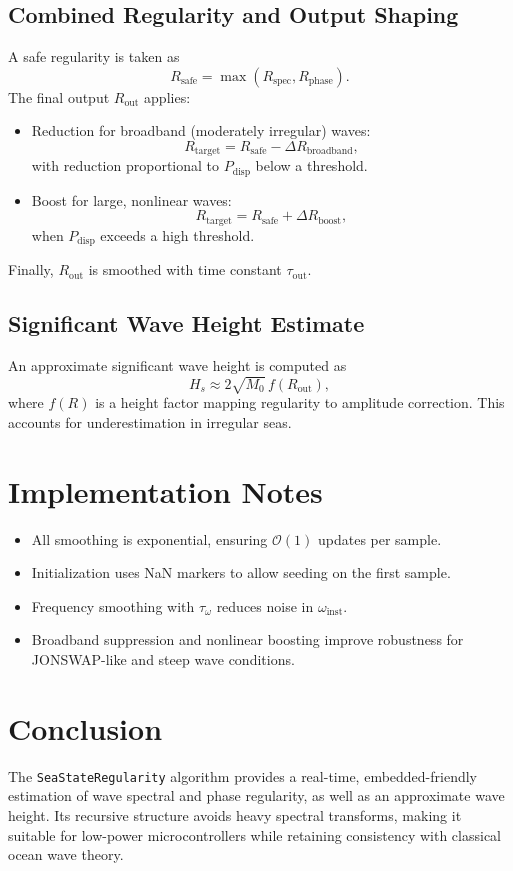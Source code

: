 \documentclass[11pt]{article}
\begin{document}
\subsection{Combined Regularity and Output Shaping}
A safe regularity is taken as
\[
R_{\text{safe}} = \max(R_{\text{spec}}, R_{\text{phase}}).
\]
The final output $R_{\text{out}}$ applies:
\begin{itemize}
    \item Reduction for broadband (moderately irregular) waves:
    \[
    R_{\text{target}} = R_{\text{safe}} - \Delta R_{\text{broadband}},
    \]
    with reduction proportional to $P_{\text{disp}}$ below a threshold.
    \item Boost for large, nonlinear waves:
    \[
    R_{\text{target}} = R_{\text{safe}} + \Delta R_{\text{boost}},
    \]
    when $P_{\text{disp}}$ exceeds a high threshold.
\end{itemize}
Finally, $R_{\text{out}}$ is smoothed with time constant $\tau_{\text{out}}$.

\subsection{Significant Wave Height Estimate}
An approximate significant wave height is computed as
\begin{equation}
H_s \approx 2\sqrt{M_0}\, f(R_{\text{out}}),
\end{equation}
where $f(R)$ is a height factor mapping regularity to amplitude correction. 
This accounts for underestimation in irregular seas.

\section{Implementation Notes}
\begin{itemize}
    \item All smoothing is exponential, ensuring $\mathcal{O}(1)$ updates per sample.
    \item Initialization uses NaN markers to allow seeding on the first sample.
    \item Frequency smoothing with $\tau_{\omega}$ reduces noise in $\omega_{\text{inst}}$.
    \item Broadband suppression and nonlinear boosting improve robustness for JONSWAP-like and steep wave conditions.
\end{itemize}

\section{Conclusion}
The \texttt{SeaStateRegularity} algorithm provides a real-time, embedded-friendly estimation of wave spectral and phase regularity, as well as an approximate wave height. Its recursive structure avoids heavy spectral transforms, making it suitable for low-power microcontrollers while retaining consistency with classical ocean wave theory.
\end{document}
